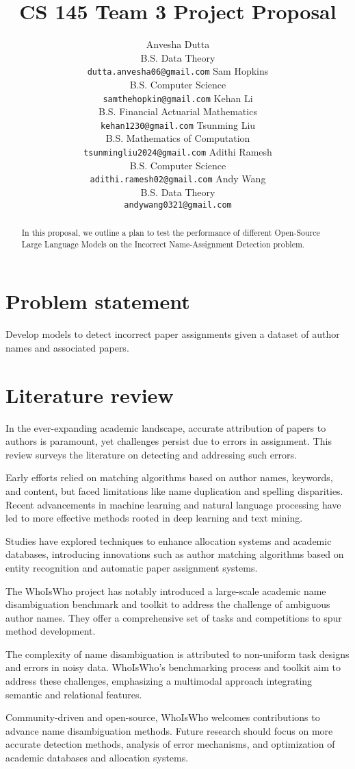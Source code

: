 \documentclass{article}
\title{CS 145 Team 3 Project Proposal}
\author{
  Anvesha Dutta \\
  B.S. Data Theory \\
  \texttt{dutta.anvesha06@gmail.com}
  \And
  Sam Hopkins \\
  B.S. Computer Science \\
  \texttt{samthehopkin@gmail.com}
  \And
  Kehan Li \\
  B.S. Financial Actuarial Mathematics \\
  \texttt{kehan1230@gmail.com}
  \And
  Tsunming Liu \\
  B.S. Mathematics of Computation \\
  \texttt{tsunmingliu2024@gmail.com}
  \And
  Adithi Ramesh \\
  B.S. Computer Science \\
  \texttt{adithi.ramesh02@gmail.com}
  \And
  Andy Wang \\
  B.S. Data Theory \\
  \texttt{andywang0321@gmail.com}
}
\begin{document}
\maketitle


\begin{abstract}
    In this proposal, we outline a plan to test the performance of different Open-Source Large Language Models on the Incorrect Name-Assignment Detection problem.
\end{abstract}


\section{Problem statement}

Develop models to detect incorrect paper assignments given a dataset of author names and associated papers.

\section{Literature review}

In the ever-expanding academic landscape, accurate attribution of papers to authors is paramount, yet challenges persist due to errors in assignment. This review surveys the literature on detecting and addressing such errors.

Early efforts relied on matching algorithms based on author names, keywords, and content, but faced limitations like name duplication and spelling disparities. Recent advancements in machine learning and natural language processing have led to more effective methods rooted in deep learning and text mining.

Studies have explored techniques to enhance allocation systems and academic databases, introducing innovations such as author matching algorithms based on entity recognition and automatic paper assignment systems.

The WhoIsWho project has notably introduced a large-scale academic name disambiguation benchmark and toolkit to address the challenge of ambiguous author names. They offer a comprehensive set of tasks and competitions to spur method development.

The complexity of name disambiguation is attributed to non-uniform task designs and errors in noisy data. WhoIsWho's benchmarking process and toolkit aim to address these challenges, emphasizing a multimodal approach integrating semantic and relational features.

Community-driven and open-source, WhoIsWho welcomes contributions to advance name disambiguation methods. Future research should focus on more accurate detection methods, analysis of error mechanisms, and optimization of academic databases and allocation systems.
\end{document}
